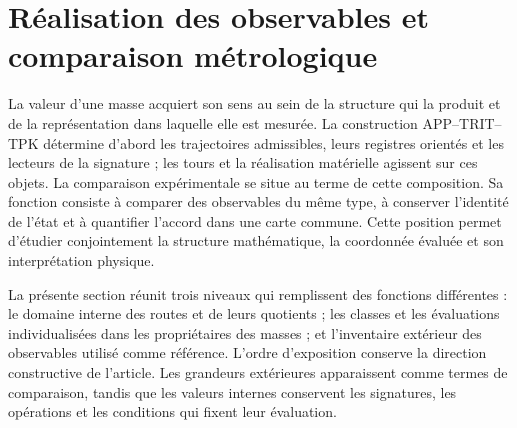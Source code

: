 
\section{Réalisation des observables et comparaison métrologique}
\label{vi:sec:vi-contraste-metrologico}

La valeur d'une masse acquiert son sens au sein de la structure qui la
produit et de la représentation dans laquelle elle est mesurée. La construction
APP--TRIT--TPK détermine d'abord les trajectoires admissibles, leurs registres
orientés et les lecteurs de la signature ; les tours et la réalisation matérielle
agissent sur ces objets. La comparaison expérimentale se situe au terme de
cette composition. Sa fonction consiste à comparer des observables du même
type, à conserver l'identité de l'état et à quantifier l'accord dans une
carte commune. Cette position permet d'étudier conjointement la structure
mathématique, la coordonnée évaluée et son interprétation physique.

La présente section réunit trois niveaux qui remplissent des fonctions différentes :
le domaine interne des routes et de leurs quotients ; les classes et les évaluations
individualisées dans les propriétaires des masses ; et l’inventaire extérieur des
observables utilisé comme référence. L’ordre d’exposition conserve la
direction constructive de l’article. Les grandeurs extérieures apparaissent comme
termes de comparaison, tandis que les valeurs internes conservent les signatures,
les opérations et les conditions qui fixent leur évaluation.

